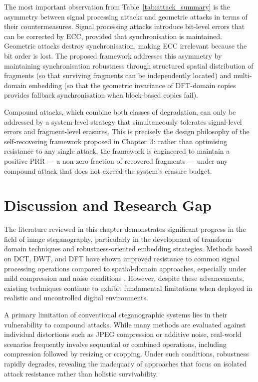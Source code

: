 \documentclass[12pt,a4paper,oneside]{report}
\begin{document}
	The most important observation from Table~\ref{tab:attack_summary} is the asymmetry between
	signal processing attacks and geometric attacks in terms of their countermeasures. Signal
	processing attacks introduce bit-level errors that can be corrected by ECC, provided that
	synchronisation is maintained. Geometric attacks destroy synchronisation, making ECC
	irrelevant because the bit order is lost. The proposed framework addresses this asymmetry
	by maintaining synchronisation robustness through structured spatial distribution of fragments
	(so that surviving fragments can be independently located) and multi-domain embedding (so that
	the geometric invariance of DFT-domain copies provides fallback synchronisation when
	block-based copies fail).
	
	Compound attacks, which combine both classes of degradation, can only be addressed by a
	system-level strategy that simultaneously tolerates signal-level errors and fragment-level
	erasures. This is precisely the design philosophy of the self-recovering framework proposed
	in Chapter~3: rather than optimising resistance to any single attack, the framework is
	engineered to maintain a positive PRR — a non-zero fraction of recovered fragments — under
	any compound attack that does not exceed the system's erasure budget.
	
	\section{Discussion and Research Gap}
	
	The literature reviewed in this chapter demonstrates significant progress in the field of image steganography, particularly in the development of transform-domain techniques and robustness-oriented embedding strategies. Methods based on DCT, DWT, and DFT have shown improved resistance to common signal processing operations compared to spatial-domain approaches, especially under mild compression and noise conditions \cite{cox2007digital}. However, despite these advancements, existing techniques continue to exhibit fundamental limitations when deployed in realistic and uncontrolled digital environments.
	
	A primary limitation of conventional steganographic systems lies in their vulnerability to compound attacks. While many methods are evaluated against individual distortions such as JPEG compression or additive noise, real-world scenarios frequently involve sequential or combined operations, including compression followed by resizing or cropping. Under such conditions, robustness rapidly degrades, revealing the inadequacy of approaches that focus on isolated attack resistance rather than holistic survivability.
	
\end{document}
